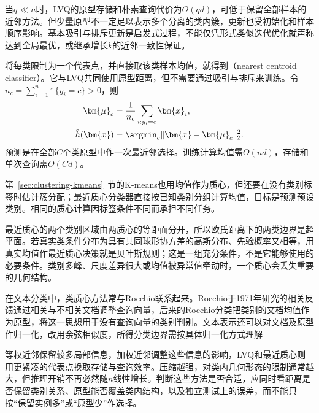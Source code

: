 当$q\ll n$时，LVQ的原型存储和朴素查询代价为$O(qd)$，可低于保留全部样本的近邻方法。但少量原型不一定足以表示多个分离的类内簇，更新也受初始化和样本顺序影响。基本吸引与排斥更新是启发式过程，不能仅凭形式类似迭代优化就声称达到全局最优，或继承增长$k$的近邻一致性保证。

将每类限制为一个代表点，并直接取该类样本均值，就得到（nearest centroid classifier）。它与LVQ共同使用原型距离，但不需要通过吸引与排斥来训练。令$n_c=\sum_{i=1}^n\mathbb{1}\{y_i=c\}>0$，则
\begin{align}
  \bm{\mu}_c&=\frac{1}{n_c}\sum_{i:y_i=c}\bm{x}_i,
  \label{eq:classification-centroid}\\
  \hat h(\bm{x})&=\argmin_c\|\bm{x}-\bm{\mu}_c\|_2^2.
  \label{eq:classification-nearest-centroid}
\end{align}
预测是在全部$C$个类原型中作一次最近邻选择。训练计算均值需$O(nd)$，存储和单次查询需$O(Cd)$。

第~\ref{sec:clustering-kmeans}~节的K-means也用均值作为质心，但还要在没有类别标签时估计簇分配；最近质心分类器直接按已知类别分组计算均值，目标是预测预设类别。相同的质心计算因标签条件不同而承担不同任务。

最近质心的两个类别区域由两质心的等距面分开，所以欧氏距离下的两类边界是超平面。若真实类条件分布为具有共同球形协方差的高斯分布、先验概率又相等，用真实均值作最近质心决策就是贝叶斯规则；这是一组充分条件，不是它能够使用的必要条件。类别多峰、尺度差异很大或均值被异常值牵动时，一个质心会丢失重要的几何结构。

在文本分类中，类质心方法常与Rocchio联系起来。Rocchio于1971年研究的相关反馈通过相关与不相关文档调整查询向量，后来的Rocchio分类把类别的文档均值作为原型，将这一思想用于没有查询向量的类别判别。文本表示还可以对文档及原型作归一化，改用余弦相似度，所得分类边界需按具体归一化方式理解

等权近邻保留较多局部信息，加权近邻调整这些信息的影响，LVQ和最近质心则用更紧凑的代表点换取存储与查询效率。压缩越强，对类内几何形态的限制通常越大，但推理开销不再必然随$n$线性增长。判断这些方法是否合适，应同时看距离是否保留类别关系、原型能否覆盖类内结构，以及独立测试上的误差，而不能只按“保留实例多”或“原型少”作选择。
